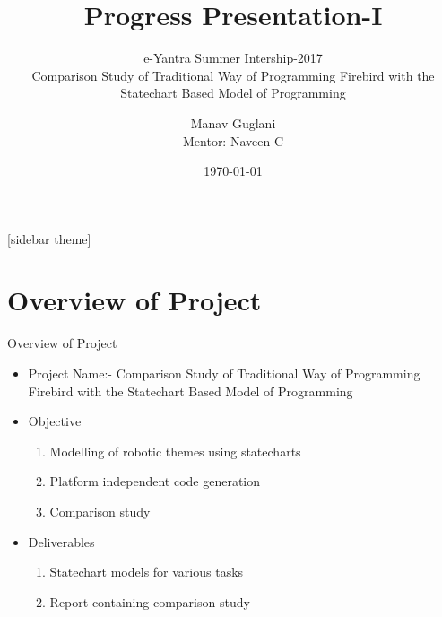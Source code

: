 \documentclass[10pt, a4paper]{beamer}
\begin{document}
	\title{Progress Presentation-I}
	\subtitle{e-Yantra Summer Intership-2017 \\Comparison Study of Traditional Way of Programming
		Firebird with the Statechart Based Model of
		Programming}
	\author{Manav Guglani\\
	Mentor: Naveen C}
	\date{\today}
	\frame{\titlepage}

[sidebar theme]
\section{Overview of Project}
\begin{frame}{Overview of Project}
	\begin{itemize}
		\item Project Name:- Comparison Study of Traditional Way of Programming
		Firebird with the Statechart Based Model of
		Programming
		\item Objective
		\begin{enumerate}
			\item Modelling of robotic themes using statecharts
			\item Platform independent code generation
			\item Comparison study
		\end{enumerate}
		\item Deliverables
		\begin{enumerate}
			\item Statechart models for various tasks
			\item Report containing comparison study
		\end{enumerate}
	\end{itemize}
\end{frame}
\end{document}
